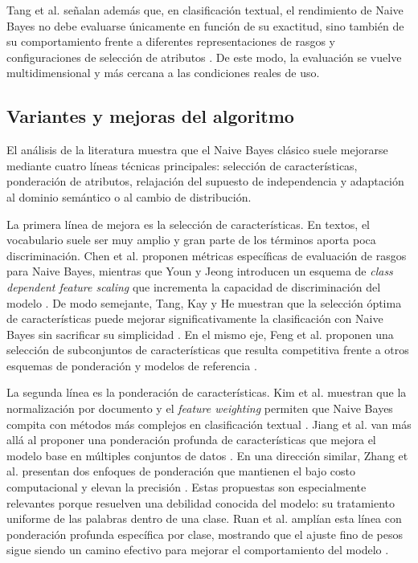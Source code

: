 Tang et al. señalan además que, en clasificación textual, el rendimiento de Naive Bayes no debe evaluarse únicamente en función de su exactitud, sino también de su comportamiento frente a diferentes representaciones de rasgos y configuraciones de selección de atributos \cite{Tang20162508}. De este modo, la evaluación se vuelve multidimensional y más cercana a las condiciones reales de uso.

\subsection{Variantes y mejoras del algoritmo}

El análisis de la literatura muestra que el Naive Bayes clásico suele mejorarse mediante cuatro líneas técnicas principales: selección de características, ponderación de atributos, relajación del supuesto de independencia y adaptación al dominio semántico o al cambio de distribución.

La primera línea de mejora es la selección de características. En textos, el vocabulario suele ser muy amplio y gran parte de los términos aporta poca discriminación. Chen et al. proponen métricas específicas de evaluación de rasgos para Naive Bayes, mientras que Youn y Jeong introducen un esquema de \textit{class dependent feature scaling} que incrementa la capacidad de discriminación del modelo \cite{CHEN20095432,YOUN2009477}. De modo semejante, Tang, Kay y He muestran que la selección óptima de características puede mejorar significativamente la clasificación con Naive Bayes sin sacrificar su simplicidad \cite{Tang20162508,Tang20161602}. En el mismo eje, Feng et al. proponen una selección de subconjuntos de características que resulta competitiva frente a otros esquemas de ponderación y modelos de referencia \cite{FENG2015109}.

La segunda línea es la ponderación de características. Kim et al. muestran que la normalización por documento y el \textit{feature weighting} permiten que Naive Bayes compita con métodos más complejos en clasificación textual \cite{Kim2006}. Jiang et al. van más allá al proponer una ponderación profunda de características que mejora el modelo base en múltiples conjuntos de datos \cite{Jiang2016}. En una dirección similar, Zhang et al. presentan dos enfoques de ponderación que mantienen el bajo costo computacional y elevan la precisión \cite{ZHANG2016137}. Estas propuestas son especialmente relevantes porque resuelven una debilidad conocida del modelo: su tratamiento uniforme de las palabras dentro de una clase. Ruan et al. amplían esta línea con ponderación profunda específica por clase, mostrando que el ajuste fino de pesos sigue siendo un camino efectivo para mejorar el comportamiento del modelo \cite{Ruan202020151}.

